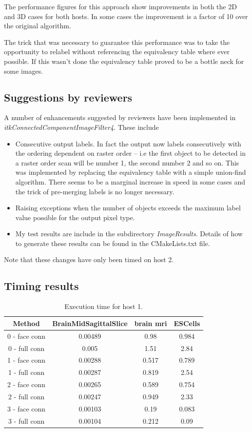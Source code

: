 \documentclass{InsightArticle}
\begin{document}
The performance figures for this approach show improvements in both
the 2D and 3D cases for both hosts. In some cases the improvement is a
factor of 10 over the original algorithm.

The trick that was necessary to guarantee this performance was to take
the opportunity to relabel without referencing the equivalency table
where ever possible. If this wasn't done the equivalency table proved
to be a bottle neck for some images.

\subsection{Suggestions by reviewers}
A number of enhancements suggested by reviewers have been implemented
in {\em itkConnectedComponentImageFilter4}. These include
\begin{itemize}
\item Consecutive output labels. In fact the output now labels 
consecutively with the ordering dependent on raster order -- i.e the
first object to be detected in a raster order scan will be number 1,
the second number 2 and so on. This was implemented by replacing the
equivalency table with a simple union-find algorithm. There seems to
be a marginal increase in speed in some cases and the trick of
pre-merging labels is no longer necessary.
\item Raising exceptions when the number of objects exceeds the maximum 
label value possible for the output pixel type.
\item My test results are include in the subdirectory {\em ImageResults}. 
Details of how to generate these results can be found in the
CMakeLists.txt file.
\end{itemize}
Note that these changes have only been timed on host 2.

\subsection{Timing results}
\begin{table}[htbp]
\centering
\begin{tabular}{|c|c|c|c|}
\hline
Method & BrainMidSagittalSlice & brain mri & ESCells \\
\hline
\hline
0 - face conn & 0.00489   & 0.98 & 0.984 \\
0 - full conn & 0.005     & 1.51 & 2.84 \\
\hline
1 - face conn & 0.00288   & 0.517 & 0.789 \\
1 - full conn & 0.00287   & 0.819 & 2.54 \\
\hline
2 - face conn & 0.00265   & 0.589 & 0.754 \\
2 - full conn & 0.00247   & 0.949 & 2.33 \\
\hline
3 - face conn & 0.00103   & 0.19 & 0.083 \\
3 - full conn & 0.00104   & 0.212 & 0.09 \\
\hline
\end{tabular}
\caption{Execution time for host 1. \label{tbl:timing1}}
\end{table}
\end{document}
